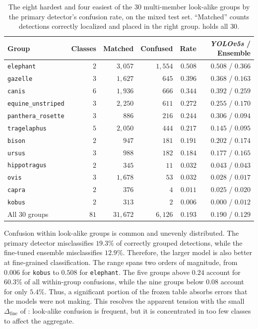 \begin{table}[htbp]
\centering
\caption[Within-group confusion, hardest and easiest groups]{The eight hardest and four easiest of the $30$ multi-member look-alike groups by the primary detector's confusion rate, on the mixed test set. \enquote{Matched} counts detections correctly localized and placed in the right group.  holds all $30$.}
\label{tab:lookalike-group-confusion-excerpt}
\small
\begin{tabular}{@{}lrrrrr@{}}
\toprule
Group & Classes & Matched & Confused & Rate & \textit{YOLOv5s} / Ensemble \\
\midrule
\texttt{elephant} & $2$ & $3{,}057$ & $1{,}554$ & $0.508$ & $0.508$ / $0.366$ \\
\texttt{gazelle} & $3$ & $1{,}627$ & $645$ & $0.396$ & $0.368$ / $0.163$ \\
\texttt{canis} & $6$ & $1{,}936$ & $666$ & $0.344$ & $0.392$ / $0.259$ \\
\texttt{equine\_unstriped} & $3$ & $2{,}250$ & $611$ & $0.272$ & $0.255$ / $0.170$ \\
\texttt{panthera\_rosette} & $3$ & $886$ & $216$ & $0.244$ & $0.306$ / $0.094$ \\
\texttt{tragelaphus} & $5$ & $2{,}050$ & $444$ & $0.217$ & $0.145$ / $0.095$ \\
\texttt{bison} & $2$ & $947$ & $181$ & $0.191$ & $0.202$ / $0.174$ \\
\texttt{ursus} & $3$ & $988$ & $182$ & $0.184$ & $0.177$ / $0.165$ \\
\midrule
\texttt{hippotragus} & $2$ & $345$ & $11$ & $0.032$ & $0.043$ / $0.043$ \\
\texttt{ovis} & $3$ & $1{,}678$ & $53$ & $0.032$ & $0.028$ / $0.017$ \\
\texttt{capra} & $2$ & $376$ & $4$ & $0.011$ & $0.025$ / $0.020$ \\
\texttt{kobus} & $2$ & $313$ & $2$ & $0.006$ & $0.000$ / $0.012$ \\
\midrule
All $30$ groups & $81$ & $31{,}672$ & $6{,}126$ & $0.193$ & $0.190$ / $0.129$ \\
\bottomrule
\end{tabular}
\end{table}

Confusion within look-alike groups is common and unevenly distributed. The primary detector misclassifies $19.3\%$ of correctly grouped detections, while the fine-tuned ensemble misclassifies $12.9\%$. Therefore, the larger model is also better at fine-grained classification. The range spans two orders of magnitude, from $0.006$ for \texttt{kobus} to $0.508$ for \texttt{elephant}. The five groups above $0.24$ account for $60.3\%$ of all within-group confusions, while the nine groups below $0.08$ account for only $5.4\%$. Thus, a significant portion of the frozen table absorbs errors that the models were not making. This resolves the apparent tension with the small $\Delta_{\text{fine}}$ of : look-alike confusion is frequent, but it is concentrated in too few classes to affect the aggregate.

